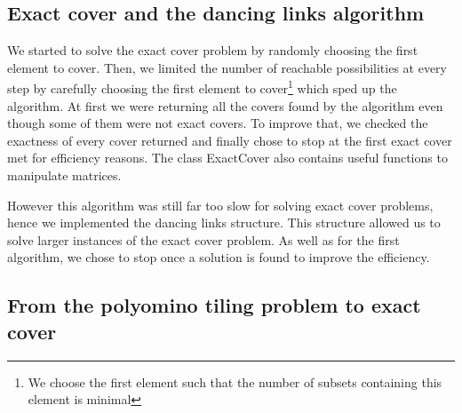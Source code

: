 \documentclass[12pt]{article}
\begin{document}
\subsection{Exact cover and the dancing links algorithm}

We started to solve the exact cover problem by randomly choosing the first element to cover. Then, we limited the number of reachable possibilities at every step by carefully choosing the first element to cover\footnote{We choose the first element such that the number of subsets containing this element is minimal} which sped up the algorithm. At first we were returning all the covers found by the algorithm even though some of them were not exact covers. To improve that, we checked the exactness of every cover returned and finally chose to stop at the first exact cover met for efficiency reasons. The class ExactCover also contains useful functions to manipulate matrices. 

However this algorithm was still far too slow for solving exact cover problems, hence we implemented the dancing links structure. This structure allowed us to solve larger instances of the exact cover problem. As well as for the first algorithm, we chose to stop once a solution is found to improve the efficiency.



\subsection{From the polyomino tiling problem to exact cover}
\end{document}
